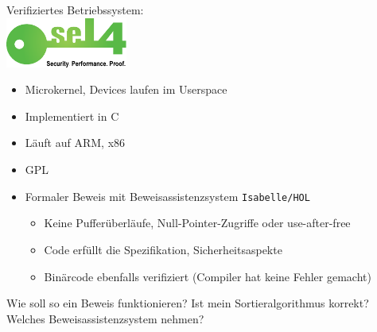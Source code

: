 \documentclass[aspectratio=169]{beamer}
\begin{document}
\begin{frame}
  \begin{center}
    Verifiziertes Betriebssystem:\\
    \includegraphics[width=4.0cm]{sel4_logo.pdf}
  \end{center}
  \begin{itemize}
  \item Microkernel, Devices laufen im Userspace
  \item Implementiert in C
  \item Läuft auf ARM, x86
  \item GPL
  \item Formaler Beweis mit Beweisassistenzsystem \texttt{Isabelle/HOL}
    \begin{itemize}
    \item Keine Pufferüberläufe, Null-Pointer-Zugriffe oder use-after-free
    \item Code erfüllt die Spezifikation, Sicherheitsaspekte
    \item Binärcode ebenfalls verifiziert (Compiler hat keine Fehler gemacht)
    \end{itemize}
  \end{itemize}
\end{frame}
\begin{frame}
  \begin{center}
    \vfill
    \Large{Wie soll so ein Beweis funktionieren?}
    \pause
    \vfill
    \Large{Ist mein Sortieralgorithmus korrekt?}
    \pause
    \vfill
    \Large{Welches Beweisassistenzsystem nehmen?}
  \end{center}  
\end{frame}
\end{document}
